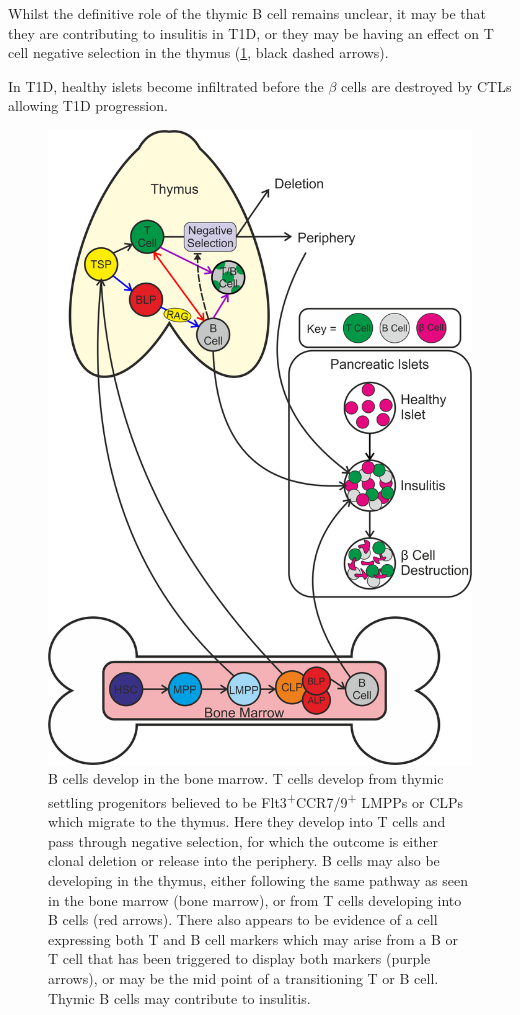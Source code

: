 Whilst the definitive role of the thymic B cell remains unclear, it may be that they are contributing to insulitis in T1D, or they may be having an effect on T cell negative selection in the thymus (\cref{fig:summarydiagram2}, black dashed arrows).

In T1D, healthy islets become infiltrated before the $\beta$ cells are destroyed by CTLs allowing T1D progression.


\begin{figure}
\includegraphics[width=\textwidth]{Figures/diagram2.png}
\caption[Diagrammatical summary of the project findings]{ 
B cells develop in the bone marrow. 
T cells develop from thymic settling progenitors believed to be Flt3\textsuperscript{+}CCR7/9\textsuperscript{+} LMPPs or CLPs which migrate to the thymus.
Here they develop into T cells and pass through negative selection, for which the outcome is either clonal deletion or release into the periphery.
B cells may also be developing in the thymus, either following the same pathway as seen in the bone marrow (bone marrow), or from T cells developing into B cells (red arrows).
There also appears to be evidence of a cell expressing both T and B cell markers which may arise from a B or T cell that has been triggered to display both markers (purple arrows), or may be the mid point of a transitioning T or B cell.
Thymic B cells may contribute to insulitis.}
\label{fig:summarydiagram2}
\end{figure}


